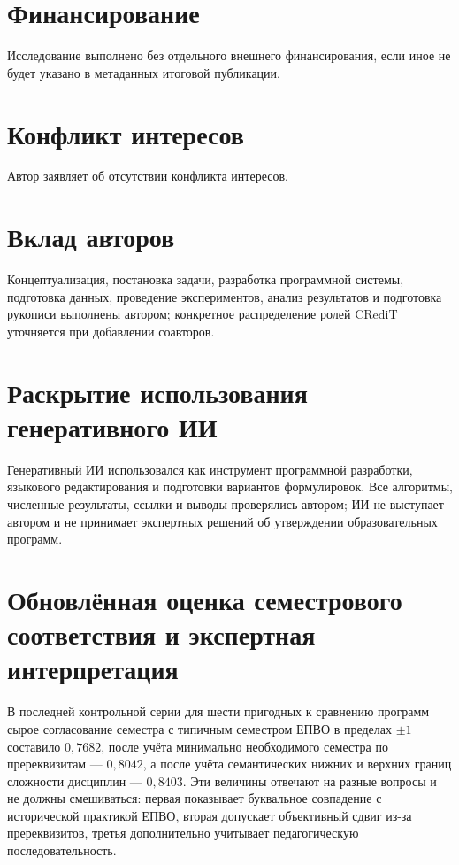 \documentclass[twoside,11pt]{article}
\begin{document}
\section*{Финансирование}
Исследование выполнено без отдельного внешнего финансирования, если иное не будет указано в метаданных итоговой публикации.

\section*{Конфликт интересов}
Автор заявляет об отсутствии конфликта интересов.

\section*{Вклад авторов}
Концептуализация, постановка задачи, разработка программной системы, подготовка данных, проведение экспериментов, анализ результатов и подготовка рукописи выполнены автором; конкретное распределение ролей CRediT уточняется при добавлении соавторов.

\section*{Раскрытие использования генеративного ИИ}
Генеративный ИИ использовался как инструмент программной разработки, языкового редактирования и подготовки вариантов формулировок. Все алгоритмы, численные результаты, ссылки и выводы проверялись автором; ИИ не выступает автором и не принимает экспертных решений об утверждении образовательных программ.

\iffalse
\section{Обновлённая оценка семестрового соответствия и экспертная интерпретация}

В последней контрольной серии для шести пригодных к сравнению программ сырое согласование семестра с типичным семестром ЕПВО в пределах $\pm1$ составило $0{,}7682$, после учёта минимально необходимого семестра по пререквизитам --- $0{,}8042$, а после учёта семантических нижних и верхних границ сложности дисциплин --- $0{,}8403$. Эти величины отвечают на разные вопросы и не должны смешиваться: первая показывает буквальное совпадение с исторической практикой ЕПВО, вторая допускает объективный сдвиг из-за пререквизитов, третья дополнительно учитывает педагогическую последовательность.
\end{document}
